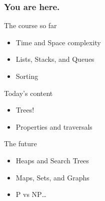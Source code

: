 \begin{frame}
	\frametitle{You are here.}
	\begin{block}{The course so far}
		\begin{itemize}
			\item Time and Space complexity
			\item Lists, Stacks, and Queues
			\item Sorting
		\end{itemize}
	\end{block}
	\pause
	\begin{exampleblock}{Today's content}
		\begin{itemize}
			\item Trees!
			\item Properties and traversals
		\end{itemize}
	\end{exampleblock}
	\pause
	\begin{block}{The future}
		\begin{itemize}
			\item Heaps and Search Trees
			\item Maps, Sets, and Graphs
			\item P vs NP\dots
		\end{itemize}
	\end{block}
\end{frame}
